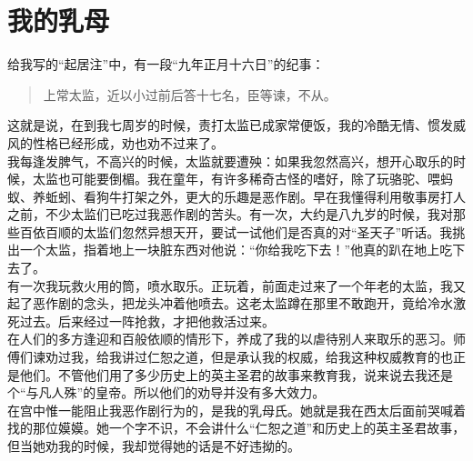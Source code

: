 \fancyhead[RO]{\thepage} %
\fancyhead[LE]{\thepage} %
\chapter*{我的乳母}
给我写的“起居注”中，有一段“九年正月十六日”的纪事：\\

\begin{quote}
	上常太监，近以小过前后答十七名，臣等谏，不从。\\
\end{quote}

这就是说，在到我七周岁的时候，责打太监已成家常便饭，我的冷酷无情、惯发威风的性格已经形成，劝也劝不过来了。\\

我每逢发脾气，不高兴的时候，太监就要遭殃：如果我忽然高兴，想开心取乐的时候，太监也可能要倒楣。我在童年，有许多稀奇古怪的嗜好，除了玩骆驼、喂蚂蚁、养蚯蚓、看狗牛打架之外，更大的乐趣是恶作剧。早在我懂得利用敬事房打人之前，不少太监们已吃过我恶作剧的苦头。有一次，大约是八九岁的时候，我对那些百依百顺的太监们忽然异想天开，要试一试他们是否真的对“圣天子”听话。我挑出一个太监，指着地上一块脏东西对他说：“你给我吃下去！”他真的趴在地上吃下去了。\\

有一次我玩救火用的筒，喷水取乐。正玩着，前面走过来了一个年老的太监，我又起了恶作剧的念头，把龙头冲着他喷去。这老太监蹲在那里不敢跑开，竟给冷水激死过去。后来经过一阵抢救，才把他救活过来。\\

在人们的多方逢迎和百般依顺的情形下，养成了我的以虐待别人来取乐的恶习。师傅们谏劝过我，给我讲过仁恕之道，但是承认我的权威，给我这种权威教育的也正是他们。不管他们用了多少历史上的英主圣君的故事来教育我，说来说去我还是个“与凡人殊”的皇帝。所以他们的劝导并没有多大效力。\\

在宫中惟一能阻止我恶作剧行为的，是我的乳母氏。她就是我在西太后面前哭喊着找的那位嫫嫫。她一个字不识，不会讲什么“仁恕之道”和历史上的英主圣君故事，但当她劝我的时候，我却觉得她的话是不好违拗的。\\


